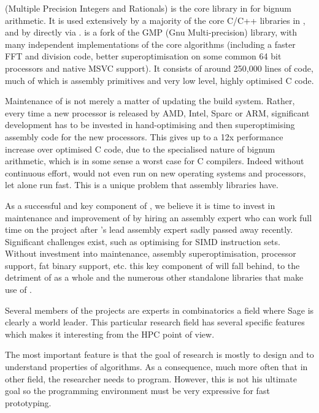 \begin{workpackage}
\begin{tasklist}
\begin{task}[title=\MPIR,id=hpc-mpir, lead=UK,PM=12]
\MPIR (Multiple Precision Integers and Rationals) is the core library in \Sage
for bignum arithmetic. It is used extensively by a majority of the core C/C++
libraries in \Sage, and by \Sage directly via \Cython. \MPIR is a fork of the 
GMP (Gnu Multi-precision) library, with many independent implementations of the
core algorithms (including a faster FFT and division code, better 
superoptimisation on some common 64 bit processors and native MSVC support). 
It consists of around 250,000 lines of code, much of which is assembly 
primitives and very low level, highly optimised C code.

Maintenance of \MPIR is not merely a matter of updating the build system.
Rather, every time a new processor is released by AMD, Intel, Sparc or ARM,
significant development has to be invested in hand-optimising and then
superoptimising assembly code for the new processors. This gives up to a 12x
performance increase over optimised C code, due to the specialised nature of
bignum arithmetic, which is in some sense a worst case for C compilers. Indeed
without continuous effort, \MPIR would not even run on new operating systems and
processors, let alone run fast. This is a unique problem that assembly libraries
have.

As a successful and key component of \Sage, we believe it is time to invest in
maintenance and improvement of \MPIR by hiring an assembly expert who can work
full time on the project after \MPIR's lead assembly expert sadly passed
away recently. Significant challenges exist, such as
optimising for SIMD instruction sets. Without investment into maintenance,
assembly superoptimisation, processor support, fat binary support, etc. this key
component of \Sage will fall behind, to the detriment of \Sage as a whole and the
numerous other standalone libraries that make use of \MPIR.
\end{task}

\begin{task}[title=HPC infrastructure for combinatorics,id=hpc-combi,PM=4,lead=PS]

  Several members of the projects are experts in combinatorics a field where
  Sage is clearly a world leader. This particular research field has several
  specific features which makes it interesting from the HPC point of
  view.

  The most important feature is that the goal of research is mostly to
  design and to understand properties of algorithms. As a consequence,
  much more often that in other field, the researcher needs to
  program. However, this is not his ultimate goal so the programming
  environment must be very expressive for fast prototyping.


\end{task}
\end{tasklist}
\end{workpackage}
